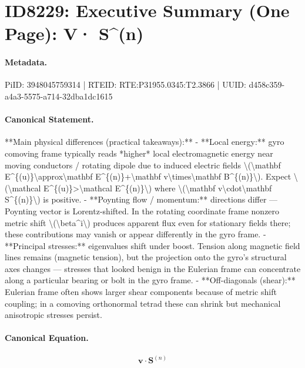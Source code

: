 \section*{ID8229: Executive Summary (One Page): V· S\textasciicircum{}(n)}
\paragraph{Metadata.}
PiID: 3948045759314 | RTEID: RTE:P31955.0345:T2.3866 | UUID: d458c359-a4a3-5575-a714-32dba1dc1615

\paragraph{Canonical Statement.}
**Main physical differences (practical takeaways):** - **Local energy:** gyro comoving frame typically reads *higher* local electromagnetic energy near moving conductors / rotating dipole due to induced electric fields \textbackslash{}(\textbackslash{}mathbf E\textasciicircum{}\{(u)\}\textbackslash{}approx\textbackslash{}mathbf E\textasciicircum{}\{(n)\}+\textbackslash{}mathbf v\textbackslash{}times\textbackslash{}mathbf B\textasciicircum{}\{(n)\}\textbackslash{}). Expect \textbackslash{}(\textbackslash{}mathcal E\textasciicircum{}\{(u)\}>\textbackslash{}mathcal E\textasciicircum{}\{(n)\}\textbackslash{}) where \textbackslash{}(\textbackslash{}mathbf v\textbackslash{}cdot\textbackslash{}mathbf S\textasciicircum{}\{(n)\}\textbackslash{}) is positive. - **Poynting flow / momentum:** directions differ — Poynting vector is Lorentz-shifted. In the rotating coordinate frame nonzero metric shift \textbackslash{}(\textbackslash{}beta\textasciicircum{}i\textbackslash{}) produces apparent flux even for stationary fields there; these contributions may vanish or appear differently in the gyro frame. - **Principal stresses:** eigenvalues shift under boost. Tension along magnetic field lines remains (magnetic tension), but the projection onto the gyro’s structural axes changes — stresses that looked benign in the Eulerian frame can concentrate along a particular bearing or bolt in the gyro frame. - **Off-diagonals (shear):** Eulerian frame often shows larger shear components because of metric shift coupling; in a comoving orthonormal tetrad these can shrink but mechanical anisotropic stresses persist.

\paragraph{Canonical Equation.}
\[
\mathbf v\cdot\mathbf S^{(n)}
\]

